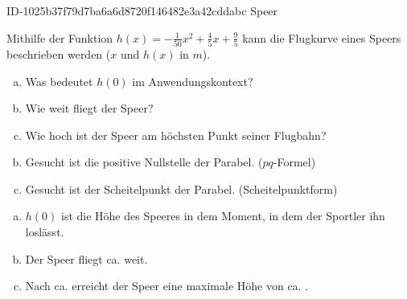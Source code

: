 \begin{exercise}
      {ID-1025b37f79d7ba6a6d8720f146482e3a42cddabc}
      {Speer}
  \ifproblem\problem\par
    Mithilfe der Funktion $h(x)=-\frac{\num{1}}{\num{50}}x^{\num{2}}+\frac{\num{4}}{\num{5}}x+\frac{\num{9}}{\num{5}}$ kann die Flugkurve
    eines Speers beschrieben werden ($x$ und $h(x)$ in $m$).
    \begin{enumerate}[a)]
      \item Was bedeutet $h(0)$ im Anwendungskontext?
      \item Wie weit fliegt der Speer?
      \item Wie hoch ist der Speer am höchsten Punkt seiner Flugbahn?
    \end{enumerate}
  \fi
  \ifoutline\outline\par
    \begin{enumerate}[a)]
      \setcounter{enumi}{1}
      \item Gesucht ist die positive Nullstelle der Parabel. ($pq$-Formel)
      \item Gesucht ist der Scheitelpunkt der Parabel. (Scheitelpunktform)
    \end{enumerate}
  \fi
  \ifoutcome\outcome\par
    \begin{enumerate}[a)]
      \item $h(0)$ ist die Höhe des Speeres in dem Moment, in dem der Sportler ihn loslässt.
      \item Der Speer fliegt ca.  weit.
      \item Nach ca.  erreicht der Speer eine maximale Höhe von ca. .
    \end{enumerate}
  \fi
\end{exercise}
